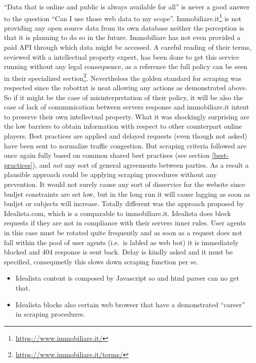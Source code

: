 \documentclass[
  12pt,
  a4paper,
  oneside]{book}
\DeclareRobustCommand{\href}[2]{#2\footnote{\url{#1}}}
\providecommand{\tightlist}{%
  \setlength{\itemsep}{0pt}\setlength{\parskip}{0pt}}
\theoremstyle{definition}
\theoremstyle{definition}
\theoremstyle{definition}
\theoremstyle{remark}
\begin{document}
``Data that is online and public is always available for all'' is never a good answer to the question ``Can I use those web data to my scope''. \href{https://www.immobiliare.it/}{Immobiliare.it} is not providing any open source data from its own database neither the perception is that it is planning to do so in the future. Immobiliare has not even provided a paid API through which data might be accessed.
A careful reading of their terms, reviewed with a intellectual property expert, has been done to get this service running without any legal consequence, as a reference the full policy can be seen in their \href{https://www.immobiliare.it/terms/}{specialized section}. Nevertheless the golden standard for scraping was respected since the robottxt is neat allowing any actions as demonstrated above. So if it might be the case of misinterpretation of their policy, it will be also the case of lack of communication between servers response and immobiliare.it intent to preserve their own intellectual property.
What it was shockingly surprising are the low barriers to obtain information with respect to other counterpart online players. Best practices are applied and delayed requests (even though not asked) have been sent to normalize traffic congestion. But scraping criteria followed are once again fully based on common shared best practises (see section \ref{best-practices}), and \emph{not} any sort of general agreements between parties. As a result a plausible approach could be applying scraping procedures without any prevention. It would not surely cause any sort of disservice for the website since budjet constraints are set low, but in the long run it will cause lagging as soon as budjet or subjects will increase. Totally different was the approach proposed by Idealista.com, which is a comparable to immobiliare.it. Idealista does block requests if they are not in compliance with their servers inner rules. User agents in this case must be rotated quite frequently and as soon as a request does not fall within the pool of user agents (i.e.~is labled as web bot) it is immediately blocked and 404 response is sent back. Delay is kindly asked and it must be specified, consequnetly this slows down scraping function per se.

\begin{itemize}
\tightlist
\item
  Idealista content is composed by Javascript so and html parser can no get that.
\item
  Idealista blocks also certain web browser that have a demonstrated ``career'' in scraping procedures.
\end{itemize}
\end{document}

